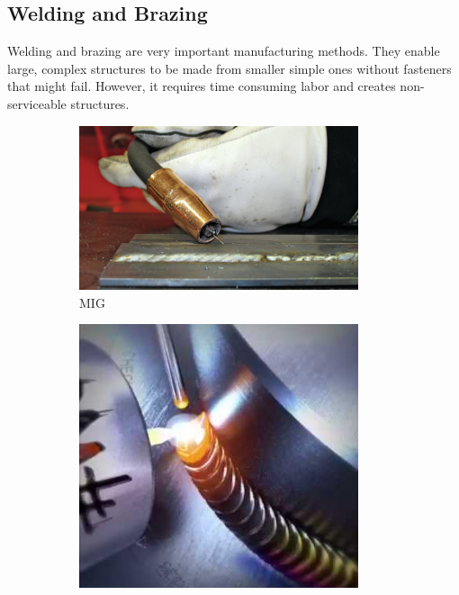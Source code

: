 \documentclass[10pt,letterpaper]{book}
\begin{document}
 	\subsection{Welding and Brazing}
 	
 	Welding and brazing are very important manufacturing methods. They enable large, complex structures to be made from smaller simple ones without fasteners that might fail. However, it requires time consuming labor and creates non-serviceable structures.
 	
 	\begin{figure}[H]
		\centering
		\begin{subfigure}[b]{.24\linewidth}
			\includegraphics[width=0.9\textwidth]{imgs/mig.png}
			\caption{MIG}
		\end{subfigure}\begin{subfigure}[b]{.24\linewidth}
			\includegraphics[width=0.9\textwidth]{imgs/tig.png}

\end{subfigure}
\end{figure}
\end{document}

